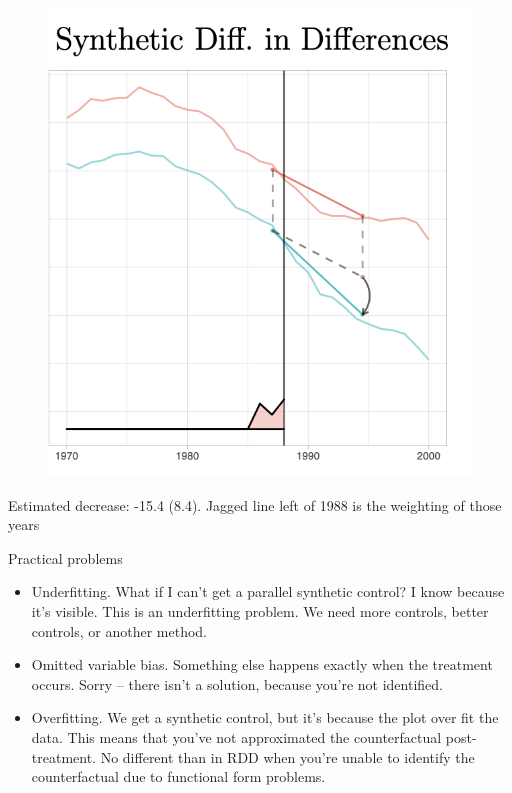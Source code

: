 \documentclass{beamer}
\begin{document}
\begin{frame}[plain]

	\begin{figure}
	\includegraphics[scale=0.65]{./lecture_includes/sdid_3.png}
	\end{figure}
	
Estimated decrease: -15.4 (8.4). Jagged line left of 1988 is the weighting of those years 	

\end{frame}






\begin{frame}{Practical problems}


\begin{itemize}
\item Underfitting. What if I can't get a parallel synthetic control?  I know because it's visible. This is an underfitting problem.  We need more controls, better controls, or another method. 
\item Omitted variable bias.  Something else happens exactly when the treatment occurs.  Sorry -- there isn't a solution, because you're not identified. 
\item Overfitting. We get a synthetic control, but it's because the plot over fit the data. This means that you've not approximated the counterfactual post-treatment.  No different than in RDD when you're unable to identify the counterfactual due to functional form problems. 
\end{itemize}

\end{frame}
\end{document}
